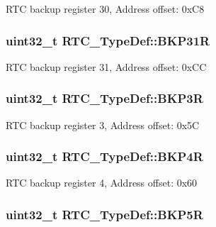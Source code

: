 R\-T\-C backup register 30, Address offset\-: 0x\-C8 \hypertarget{struct_r_t_c___type_def_a4bccd0b2feecc2e2159898857bab6d89}{
\subsubsection[{B\-K\-P31\-R}]{ uint32\-\_\-t R\-T\-C\-\_\-\-Type\-Def\-::\-B\-K\-P31\-R}}\label{struct_r_t_c___type_def_a4bccd0b2feecc2e2159898857bab6d89}
R\-T\-C backup register 31, Address offset\-: 0x\-C\-C \hypertarget{struct_r_t_c___type_def_ac3802c3b17482a0667fb34ddd1863434}{
\subsubsection[{B\-K\-P3\-R}]{ uint32\-\_\-t R\-T\-C\-\_\-\-Type\-Def\-::\-B\-K\-P3\-R}}\label{struct_r_t_c___type_def_ac3802c3b17482a0667fb34ddd1863434}
R\-T\-C backup register 3, Address offset\-: 0x5\-C \hypertarget{struct_r_t_c___type_def_a6131b2f2896c122cf223206e4cfd2bd0}{
\subsubsection[{B\-K\-P4\-R}]{ uint32\-\_\-t R\-T\-C\-\_\-\-Type\-Def\-::\-B\-K\-P4\-R}}\label{struct_r_t_c___type_def_a6131b2f2896c122cf223206e4cfd2bd0}
R\-T\-C backup register 4, Address offset\-: 0x60 \hypertarget{struct_r_t_c___type_def_a0f3a33de81247ec5729e400a1261f917}{
\subsubsection[{B\-K\-P5\-R}]{ uint32\-\_\-t R\-T\-C\-\_\-\-Type\-Def\-::\-B\-K\-P5\-R}}\label{struct_r_t_c___type_def_a0f3a33de81247ec5729e400a1261f917}
